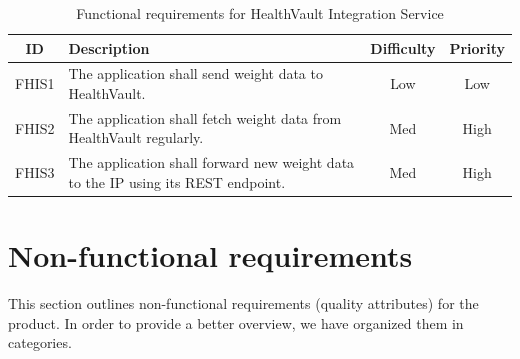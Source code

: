\begin{table}[H]
\begin{center}
\begin{tabular}{ | c | p{9cm} | c | c |}
  \hline
  ID & Description & Difficulty & Priority\\
  \hline\noalign{\smallskip}\noalign{\smallskip}\hline
  FHIS1	& The application shall send weight data to HealthVault.						   & Low	& Low \\
  FHIS2	& The application shall fetch weight data from HealthVault regularly.		       & Med	& High \\
  FHIS3	& The application shall forward new weight data to the IP using its REST endpoint. & Med	& High \\
  \hline
\end{tabular}
\end{center}
\caption{Functional requirements for HealthVault Integration Service}
\label{table:reqwebservice}
\end{table}


\section{Non-functional requirements}
\label{section:nonfunctionalreq}

This section outlines non-functional requirements (quality attributes) for the product.
In order to provide a better overview, we have organized them in categories.


